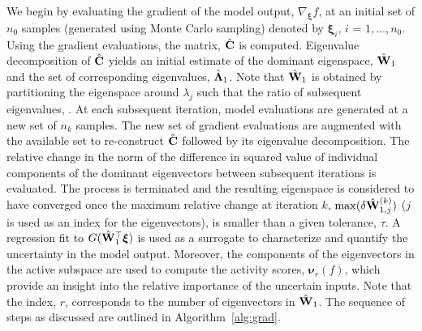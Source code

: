 We begin by evaluating the gradient of the model output, $\nabla_{\bm{\xi}}f$,
at an initial set of $n_0$ samples (generated using Monte Carlo sampling)
denoted by $\bm{\xi}_i$, $i$ = $1,\ldots,n_0$.
Using the gradient
evaluations, the matrix, $\hat{\mathbf{{C}}}$ is computed. Eigenvalue decomposition
of $\hat{\mathbf{{C}}}$ yields an initial estimate of the dominant eigenspace,
$\hat{\mathbf{{W}}}_1$ and the set of corresponding eigenvalues, 
$\hat{\mathbf{{\Lambda}}}_1$. Note that $\hat{\mathbf{{W}}}_1$ is obtained by
partitioning the eigenspace around $\lambda_j$ such that the ratio of
subsequent eigenvalues,
.
 At each subsequent iteration, model evaluations are
generated at a new set of $n_k$ samples. The new set of gradient evaluations
are augmented with the available set to re-construct $\hat{\mathbf{{C}}}$ followed
by its eigenvalue decomposition. The relative change in the norm of the
difference in squared value of individual components of the dominant
eigenvectors between subsequent iterations is evaluated. The process is
terminated and the resulting eigenspace is considered to have converged once
the maximum relative change at iteration $k$, $\max(\delta \hat{\mathbf{{W}}}_{1,j}^{(k)})$
($j$ is used as an index for the eigenvectors),
is smaller than a given tolerance, $\tau$.  A regression fit to
$G(\hat{\mathbf{{W}}}_1^\top\bm{\xi})$ is used as a surrogate to characterize and
quantify the uncertainty in the model output. Moreover, the components of the
eigenvectors in the active subspace are used to compute the activity scores, $\bm{\nu}_r(f)$,
which provide an insight into the relative importance of the uncertain inputs.
Note that the index, $r$, corresponds to the number of eigenvectors in
$\hat{\mathbf{{W}}}_1$. The sequence of steps as discussed are outlined
in Algorithm~\ref{alg:grad}.


